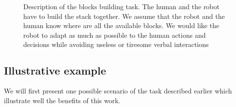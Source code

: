 \documentclass[english,a4paper,11pt,twoside]{StyleThese}
\begin{document}
\begin{figure}[!h]
\centering
    \caption{Description of the blocks building task. The human and the robot have to build the stack together. We assume that the robot and the human know where are all the available blocks. We would like the robot to adapt as much as possible to the human actions and decisions while avoiding useless or tiresome verbal interactions}
    \label{fig:blocksBuildingTask}
\end{figure}

\subsection{Illustrative example}

We will first present one possible scenario of the task described earlier which illustrate well the benefits of this work.
\end{document}
